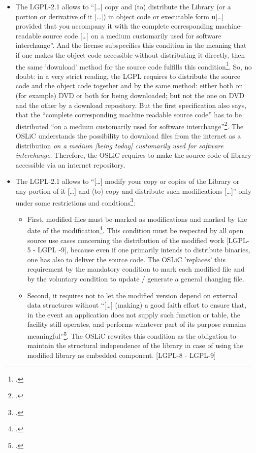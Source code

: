 \begin{itemize}
  \item The LGPL-2.1 allows to \enquote{[\ldots] copy and (to) distribute the
  Library (or a portion or derivative of it [\ldots]) in object code or
  executable form u[\ldots] provided that you accompany it with the complete
  corresponding machine-readable source code [\ldots] on a medium customarily
  used for software interchange}. And the license subspecifies this condition in
  the meaning that if one makes the object code accessible without distributing
  it directly, then the same 'download' method for the source code fulfills this
  condition\footcite[cf.][\nopage wp.\ §4]{Lgpl21OsiLicense1999a}. So, no doubt:
  in a very strict reading, the LGPL requires to distribute the source code and
  the object code together and by the same method: either both on (for example)
  DVD or both for being downloaded; but not the one on DVD and the other by a
  download repository. But the first specification also says, that the
  \enquote{complete corresponding machine readable source code} has to be
  distributed \enquote{on a medium customarily used for software
  interchange}\footcite[cf.][\nopage wp.\ §4]{Lgpl21OsiLicense1999a}. The OSLiC
  understands the possibility to download files from the internet as a
  distribution \emph{on a medium [being today] customarily used for software
  interchange}. Therefore, the OSLiC requires to make the source code of library
  accessible via an internet repository.
  
  \item The LGPL-2.1 allows to \enquote{[\ldots] modify your copy or copies of
  the Library or any portion of it [\ldots] and (to) copy and distribute such
  modifications [\ldots]} only under some restrictions and
  condtions\footcite[cf.][\nopage wp.\ §2]{Lgpl21OsiLicense1999a}:
  \begin{itemize}
    \item First, modified files must be marked as modifications and marked by
    the date of the modification\footcite[cf.][\nopage wp.\
    §2]{Lgpl21OsiLicense1999a}. This condition must be respected by all open
    source use cases concerning the distribution of the modified work [LGPL-5 -
    LGPL -9], because even if one primarily intends to distribute binaries, one
    has also to deliver the source code. The OSLiC 'replaces' this requirement
    by the mandatory condition to mark each modified file and by the voluntary
    condition to update / generate a general changing file.
    
    \item Second, it requires not to let the modified version depend on
    external data structures without \enquote{[\ldots] (making) a good faith
    effort to ensure that, in the event an application does not supply such
    function or table, the facility still operates, and performs whatever part
    of its purpose remains meaningful}\footcite[cf.][\nopage wp.\
    §2]{Lgpl21OsiLicense1999a}. The OSLiC rewrites this condition as the
    obligation to maintain the structural independence of the library in case
    of using the modified library as embedded component. [LGPL-8 - LGPL-9]
    

\end{itemize}
\end{itemize}
